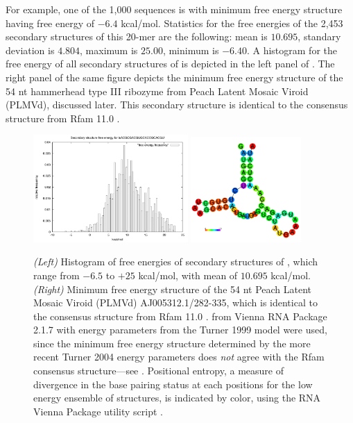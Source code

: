 For example, one of the 1,000 sequences is  with
minimum free energy structure  having free
energy of $-6.4$ kcal/mol. Statistics for the free energies of the
2,453 secondary structures of this 20-mer are the following: mean is
$10.695$, standary deviation is $4.804$, maximum is $25.00$, minimum
is $-6.40$. A histogram for the free energy of all secondary
structures of  is depicted in
the left panel of . The right panel of the
same figure depicts the minimum free energy structure of the
54 nt hammerhead type III ribozyme from Peach Latent Mosaic Viroid
(PLMVd), discussed later. This secondary structure is identical
to the consensus structure from Rfam 11.0 \citep{Gardner.nar11}.

\begin{figure}[!ht]
\centering
\includegraphics[width=0.525\textwidth]{Figures/Hermes/plmvDist.pdf}
\quad
\includegraphics[width=0.375\textwidth]{Figures/Hermes/plmvStr.pdf}
\caption{
{\em (Left)} Histogram of free energies of secondary structures of
, which range from $-6.5$ to $+25$ kcal/mol, with
mean of $10.695$ kcal/mol.
{\em (Right)} Minimum free energy structure of the 54 nt Peach Latent Mosaic
Viroid (PLMVd) AJ005312.1/282-335, which is identical to the consensus
structure from Rfam 11.0 \citep{Gardner.nar11}. \rfold from
Vienna RNA Package 2.1.7 with energy parameters from the Turner 1999
model were used, since the minimum free energy structure determined by
the more recent Turner 2004 energy parameters
does {\em not} agree with the Rfam consensus structure---see
\citep{synthetichammerheads}. Positional entropy, a measure
of divergence in the base pairing status at each positions for the
low energy ensemble of structures, is indicated by color, using the
RNA Vienna Package utility script .
}
\label{fig:hermes:plmv}
\end{figure}

